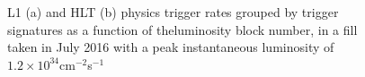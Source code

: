 \documentclass[a4paper, oneside, 11pt, openright]{book}
\begin{document}
					\begin{figure}
						\centering
						 \quad
						\caption{L1 (a) and HLT (b) physics trigger rates grouped by trigger signatures as a function of theluminosity block number, in a fill taken in July 2016 with a peak instantaneous luminosity of $1.2 \times 10^{34}$cm$^{-2}$s$^{-1}$}
						\label{fig:Trigger system}
					\end{figure}
\end{document}
